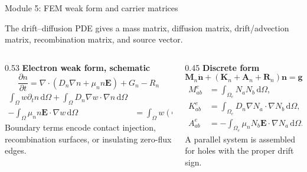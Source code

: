 \documentclass[aspectratio=169,9pt]{beamer}
\newcommand{\dd}{\,\mathrm{d}}
\newcommand{\grad}{\nabla}
\newcommand{\divg}{\nabla\!\cdot}
\newcommand{\E}{\bm{E}}
\newcommand{\vect}[1]{\bm{#1}}
\newcommand{\mat}[1]{\mathbf{#1}}
\begin{document}
\begin{frame}{Module 5: FEM weak form and carrier matrices}
\footnotesize
\vspace{-3mm}
\begin{bluebox}
\centering
The drift--diffusion PDE gives a mass matrix, diffusion matrix, drift/advection matrix, recombination matrix, and source vector.
\end{bluebox}

\vspace{1mm}
\begin{columns}[T,totalwidth=\textwidth]
\begin{column}{0.53\textwidth}
\textbf{Electron weak form, schematic}
\begin{equation*}
\frac{\partial n}{\partial t}=\divg(D_n\grad n+\mu_nn\E)+G_n-R_n
\end{equation*}
{\scriptsize
\begin{align*}
\int_\Omega w\partial_t n\dd\Omega
+\int_\Omega D_n\grad w\cdot\grad n\dd\Omega&\nonumber\\
-\int_\Omega \mu_n n\E\cdot\grad w\dd\Omega
&=\int_\Omega w(G_n-R_n)\dd\Omega .
\end{align*}}
\small
Boundary terms encode contact injection, recombination surfaces, or insulating zero-flux edges.
\end{column}
\begin{column}{0.45\textwidth}
\textbf{Discrete form}
\begin{equation*}
\boxed{\mat{M}_n\dot{\vect{n}}+(\mat{K}_n+\mat{A}_n+\mat{R}_n)\vect{n}=\vect{g}_n}
\end{equation*}
{\scriptsize
\begin{align*}
M^e_{ab}&=\int_{\Omega_e}N_aN_b\dd\Omega,\\
K^e_{ab}&=\int_{\Omega_e}D_n\grad N_a\cdot\grad N_b\dd\Omega,\\
A^e_{ab}&=-\int_{\Omega_e}\mu_n N_b\E\cdot\grad N_a\dd\Omega.
\end{align*}}
\small
A parallel system is assembled for holes with the proper drift sign.
\end{column}
\end{columns}
\end{frame}
\end{document}
